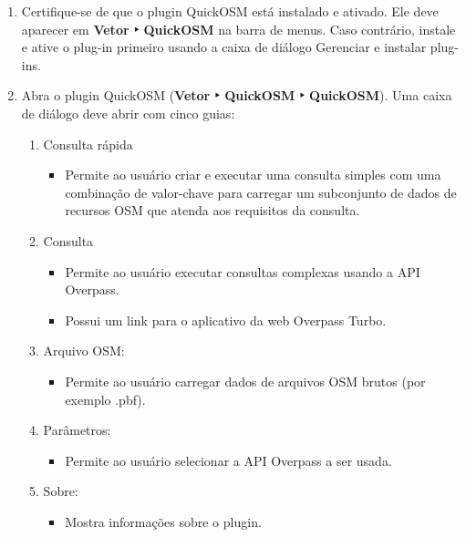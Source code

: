 \documentclass[
]{book}
\providecommand{\tightlist}{%
  \setlength{\itemsep}{0pt}\setlength{\parskip}{0pt}}
\begin{document}
\begin{enumerate}
\def\labelenumi{\arabic{enumi}.}
\setcounter{enumi}{1}
\item
  Certifique-se de que o plugin QuickOSM está instalado e ativado. Ele deve aparecer em \textbf{Vetor ‣ QuickOSM} na barra de menus. Caso contrário, instale e ative o plug-in primeiro usando a caixa de diálogo Gerenciar e instalar plug-ins.
\item
  Abra o plugin QuickOSM (\textbf{Vetor ‣ QuickOSM ‣ QuickOSM}). Uma caixa de diálogo deve abrir com cinco guias:

  \begin{enumerate}
  \def\labelenumii{\arabic{enumii}.}
  \tightlist
  \item
    Consulta rápida

    \begin{itemize}
    \tightlist
    \item
      Permite ao usuário criar e executar uma consulta simples com uma combinação de valor-chave para carregar um subconjunto de dados de recursos OSM que atenda aos requisitos da consulta.
    \end{itemize}
  \item
    Consulta

    \begin{itemize}
    \tightlist
    \item
      Permite ao usuário executar consultas complexas usando a API Overpass.
    \item
      Possui um link para o aplicativo da web Overpass Turbo.
    \end{itemize}
  \item
    Arquivo OSM:

    \begin{itemize}
    \tightlist
    \item
      Permite ao usuário carregar dados de arquivos OSM brutos (por exemplo .pbf).
    \end{itemize}
  \item
    Parâmetros:

    \begin{itemize}
    \tightlist
    \item
      Permite ao usuário selecionar a API Overpass a ser usada.
    \end{itemize}
  \item
    Sobre:

    \begin{itemize}
    \tightlist
    \item
      Mostra informações sobre o plugin.
    \end{itemize}
  \end{enumerate}
\end{enumerate}
\end{document}
